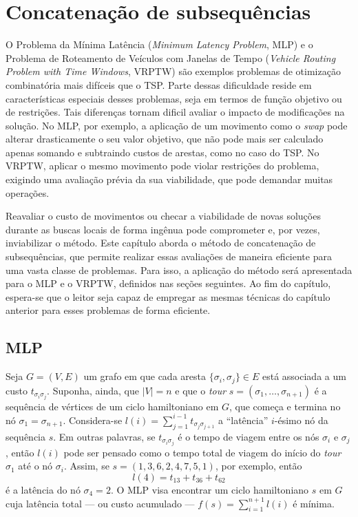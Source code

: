 \chapter{Concatenação de subsequências}
\thispagestyle{empty}
O Problema da Mínima Latência (\textit{Minimum Latency Problem}, MLP)  e o Problema de Roteamento de Veículos com Janelas de Tempo (\textit{Vehicle Routing Problem with Time Windows}, VRPTW)  são exemplos problemas de otimização combinatória mais difíceis que o TSP. Parte dessas dificuldade reside em características especiais desses problemas, seja em termos de função objetivo ou de restrições. Tais diferenças tornam dificil avaliar o impacto de modificações na solução. No MLP, por exemplo, a aplicação de um movimento como o \textit{swap} pode alterar drasticamente o seu valor objetivo, que não pode mais ser calculado apenas somando e subtraindo custos de arestas, como no caso do TSP. No VRPTW, aplicar o mesmo movimento pode violar restrições do problema, exigindo uma avaliação prévia da sua viabilidade, que pode demandar muitas operações.

Reavaliar o custo de movimentos ou checar a viabilidade de novas soluções durante as buscas locais de forma ingênua pode comprometer e, por vezes, inviabilizar o método. Este capítulo aborda o método de concatenação de subsequências, que permite realizar essas avaliações de maneira eficiente para uma vasta classe de problemas. Para isso, a aplicação do método será apresentada para o MLP e o VRPTW, definidos nas seções seguintes. Ao fim do capítulo, espera-se que o leitor seja capaz de empregar as mesmas técnicas do capítulo anterior para esses problemas de forma eficiente.

\section{MLP}
Seja \(G = (V, E)\) um grafo em que cada aresta $\{\sigma_i, \sigma_j\} \in E$ está associada a um custo \(t_{{\sigma_i}{\sigma_j}}\). Suponha, ainda, que $|V| = n$ e que o \textit{tour} $s = (\sigma_1, \dots, \sigma_{n+1})$ é a sequência de vértices de um ciclo hamiltoniano em $G$, que começa e termina no nó $\sigma_1 = \sigma_{n+1}$. Considera-se $l(i) = \sum_{j=1}^{i-1} t_{{\sigma_j}{\sigma_{j+1}}}$ a ``latência'' $i$-ésimo nó da sequência $s$. Em outras palavras, se $t_{{\sigma_i}{\sigma_j}}$ é o tempo de viagem entre os nós $\sigma_i$ e $\sigma_j$, então $l(i)$ pode ser pensado como o tempo total de viagem do início do \textit{tour} $\sigma_1$ até o nó $\sigma_i$. Assim, se \(s = (1,3,6,2,4,7,5,1)\), por exemplo, então \[l(4) = t_{{1}{3}} + t_{{3}{6}} + t_{{6}{2}}\] é a latência do nó $\sigma_4 = 2$. O MLP visa encontrar um ciclo hamiltoniano $s$ em $G$ cuja latência total --- ou custo acumulado ---  \(f(s) = \sum_{i = 1}^{n+1} l(i) \) é mínima. 


